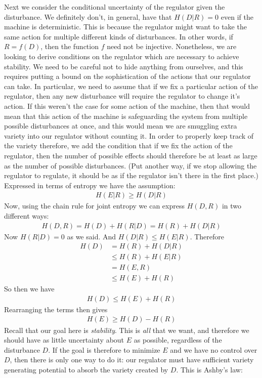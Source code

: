\documentclass{article}
\theoremstyle{definition}
\theoremstyle{plain}
\begin{document}
Next we consider the conditional uncertainty of the regulator given the disturbance. We definitely don't, in general, have that $H(D|R) = 0$ even if the machine is deterministic. This is because the regulator might want to take the same action for multiple different kinds of disturbances. In other words, if $R = f(D)$, then the function $f$ need not be injective. Nonetheless, we are looking to derive conditions on the regulator which are necessary to achieve stability. We need to be careful not to hide anything from ourselves, and this requires putting a bound on the sophistication of the actions that our regulator can take. In particular, we need to assume that if we fix a particular action of the regulator, then any new disturbance will require the regulator to change it's action. If this weren't the case for some action of the machine, then that would mean that this action of the machine is safeguarding the system from multiple possible disturbances at once, and this would mean we are smuggling extra variety into our regulator without counting it. In order to properly keep track of the variety therefore, we add the condition that if we fix the action of the regulator, then the number of possible effects should therefore be at least as large as the number of possible disturbances. (Put another way, if we stop allowing the regulator to regulate, it should be as if the regulator isn't there in the first place.) Expressed in terms of entropy we have the assumption:
 \begin{align}
	H(E|R) \geq H(D|R)
\end{align}
Now, using the chain rule for joint entropy we can express $H(D,R)$ in two different ways:
\begin{align}
	H(D,R) = H(D)+H(R|D) = H(R)+H(D|R)
\end{align}
Now $H(R|D) = 0$ as we said. And $H(D|R) \leq H(E|R)$. Therefore
\begin{align}
	H(D) &= H(R)+H(D|R) \\ &\leq H(R)+H(E|R) \\ &= H(E,R) \\ &\leq H(E)+H(R)
\end{align}
So then we have 
\begin{align}
	H(D) \leq H(E)+H(R)
\end{align}
Rearranging the terms then gives 
\begin{align}
	H(E) \geq H(D)-H(R)
\end{align}
Recall that our goal here is \emph{stability}. This is \emph{all} that we want, and therefore we should have as little uncertainty about $E$ as possible, regardless of the disturbance $D$. If the goal is therefore to minimize $E$ and we have no control over $D$, then there is only one way to do it: our regulator must have sufficient variety generating potential to absorb the variety created by $D$. This is Ashby's law:
\end{document}

